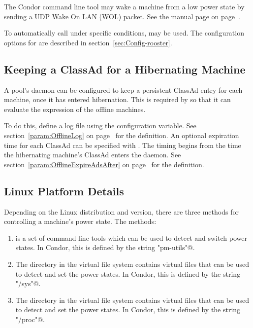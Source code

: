 The Condor command line tool  may wake a machine
from a low power state by 
sending a UDP Wake On LAN (WOL) packet.  See the  manual page on
page~\pageref{man-condor-power}.

To automatically call  under specific conditions,
 may be used.  The configuration options for
 are described in section~\ref{sec:Config-rooster}.

\subsection{Keeping a ClassAd for a Hibernating Machine}

A pool's  daemon can be configured to keep a 
persistent ClassAd entry for each machine, once it has entered hibernation.
This is required by  so that it can evaluate the
 expression of the offline machines.

To do this, define a log file using the 
configuration variable.
See section~\ref{param:OfflineLog} on
page~\pageref{param:OfflineLog} for the definition.
An optional expiration time for each ClassAd can
be specified with .
The timing begins from the time the hibernating machine's ClassAd enters
the  daemon.
See section~\ref{param:OfflineExpireAdsAfter} on
page~\pageref{param:OfflineExpireAdsAfter} for the definition.

\subsection{Linux Platform Details}

Depending on the Linux distribution and version,
there are three 
methods for controlling a machine's power state.
The methods:
\begin{enumerate}
\item {} is a set of command line tools which can be used to
  detect and switch power states.
  In Condor, this is defined by the string \verb@"pm-utils"@.
\item The directory in the virtual file system  
  contains virtual files that can be used to detect and set the power states.
  In Condor, this is defined by the string \verb@"/sys"@.
\item The directory in the virtual file system  
  contains virtual files that can be used to detect and set the power states.
  In Condor, this is defined by the string \verb@"/proc"@.
\end{enumerate}

